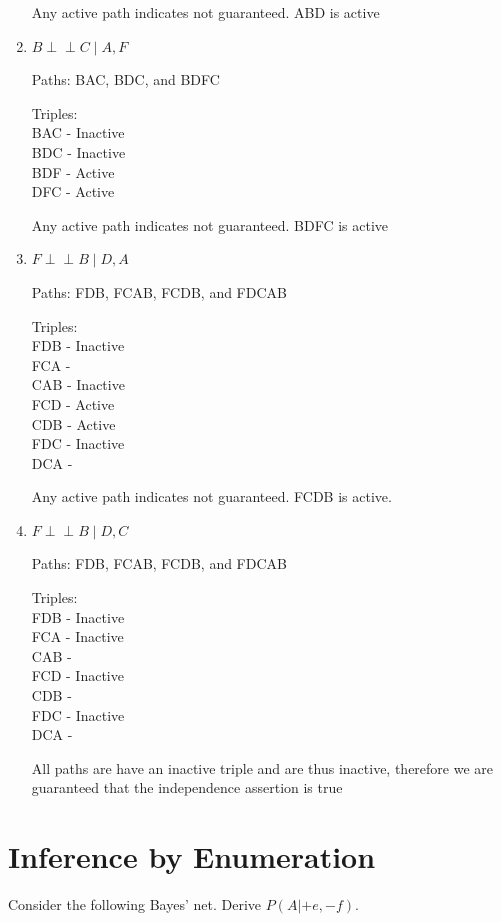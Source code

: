 \documentclass[12pt]{article}
\newcommand{\indep}{\perp\!\!\!\perp}
\begin{document}
\begin{enumerate}
Any active path indicates not guaranteed. ABD is active

\item $B \indep C \mid A, F$ 

Paths: BAC, BDC, and BDFC

Triples: \\
BAC - Inactive \\
BDC - Inactive \\
BDF - Active \\
DFC - Active

Any active path indicates not guaranteed. BDFC is active

\item $F \indep B \mid D, A$

Paths: FDB, FCAB, FCDB, and FDCAB

Triples: \\
FDB - Inactive \\
FCA - \\
CAB - Inactive \\
FCD - Active\\
CDB - Active\\
FDC - Inactive\\
DCA - 

Any active path indicates not guaranteed. FCDB is active.

\item $F \indep B \mid D, C$ 

Paths: FDB, FCAB, FCDB, and FDCAB

Triples: \\
FDB - Inactive\\
FCA - Inactive\\
CAB - \\
FCD - Inactive\\
CDB - \\
FDC - Inactive \\
DCA - 

All paths are have an inactive triple and are thus inactive, therefore we are guaranteed that the independence assertion is true

\end{enumerate}


\clearpage

\section{Inference by Enumeration}

Consider the following Bayes' net.  Derive $P(A|+e,-f)$.
\end{document}
